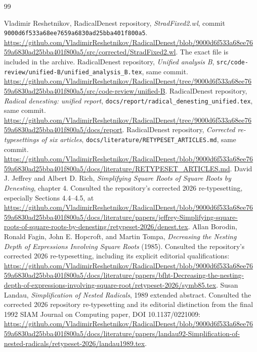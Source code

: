 \documentclass[11pt,a4paper]{article}
\theoremstyle{definition}\newtheorem{definition}[proposition]{Definition}
\theoremstyle{remark}\newtheorem{remark}[proposition]{Remark}
\begin{document}
\begin{thebibliography}{99}
\raggedright
{} Vladimir Reshetnikov, RadicalDenest repository,
\emph{StradFixed2.wl}, commit
\texttt{9000d6f533a68ee7659a6830ad25bba401f800a5}.
\url{https://github.com/VladimirReshetnikov/RadicalDenest/blob/9000d6f533a68ee7659a6830ad25bba401f800a5/src/corrected/StradFixed2.wl}.
The exact file is included in the archive.
 RadicalDenest repository, \emph{Unified analysis B},
\nolinkurl{src/code-review/unified-B/unified_analysis_B.tex}, same commit.
\url{https://github.com/VladimirReshetnikov/RadicalDenest/tree/9000d6f533a68ee7659a6830ad25bba401f800a5/src/code-review/unified-B}.
 RadicalDenest repository, \emph{Radical denesting: unified report},
\nolinkurl{docs/report/radical_denesting_unified.tex}, same commit.
\url{https://github.com/VladimirReshetnikov/RadicalDenest/tree/9000d6f533a68ee7659a6830ad25bba401f800a5/docs/report}.
 RadicalDenest repository, \emph{Corrected re-typesettings of six
articles}, \nolinkurl{docs/literature/RETYPESET_ARTICLES.md}, same commit.
\url{https://github.com/VladimirReshetnikov/RadicalDenest/blob/9000d6f533a68ee7659a6830ad25bba401f800a5/docs/literature/RETYPESET_ARTICLES.md}.
 David J. Jeffrey and Albert D. Rich,
\emph{Simplifying Square Roots of Square Roots by Denesting}, chapter 4.
Consulted the repository's corrected 2026 re-typesetting, especially
Sections 4.4--4.5, at
\url{https://github.com/VladimirReshetnikov/RadicalDenest/blob/9000d6f533a68ee7659a6830ad25bba401f800a5/docs/literature/papers/jeffrey-Simplifying-square-roots-of-square-roots-by-denesting/retypeset-2026/denest.tex}.
 Allan Borodin, Ronald Fagin, John E. Hopcroft, and Martin Tompa,
\emph{Decreasing the Nesting Depth of Expressions Involving Square Roots}
(1985). Consulted the repository's corrected 2026 re-typesetting, including
its explicit editorial qualifications:
\url{https://github.com/VladimirReshetnikov/RadicalDenest/blob/9000d6f533a68ee7659a6830ad25bba401f800a5/docs/literature/papers/bfht-Decreasing-the-nesting-depth-of-expressions-involving-square-root/retypeset-2026/symb85.tex}.
 Susan Landau, \emph{Simplification of Nested Radicals}, 1989
extended abstract. Consulted the corrected 2026 repository re-typesetting and
its editorial distinction from the final 1992 SIAM Journal on Computing paper,
DOI 10.1137/0221009:
\url{https://github.com/VladimirReshetnikov/RadicalDenest/blob/9000d6f533a68ee7659a6830ad25bba401f800a5/docs/literature/papers/landau92-Simplification-of-nested-radicals/retypeset-2026/landau1989.tex}.

\end{thebibliography}
\end{document}
